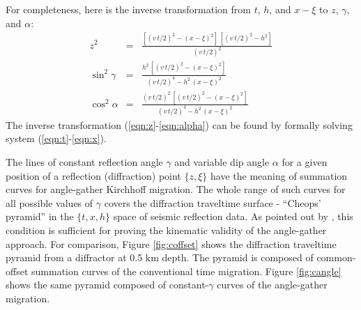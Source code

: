 For completeness, here is the inverse transformation from $t$, $h$,
and $x-\xi$ to $z$, $\gamma$, and $\alpha$:
\begin{eqnarray}
  \label{eqn:z}
  z^2 & = & 
  \frac{
    \left[(v\,t/2)^2 - (x-\xi)^2\right]\,
    \left[(v\,t/2)^2 - h^2\right]
    }{(v\,t/2)^2} 
  \\ \label{eqn:gamma}
  \sin^2{\gamma} & = & 
  \frac{h^2\, \left[(v\,t/2)^2 - (x-\xi)^2\right]}
  {(v\,t/2)^4 - h^2\,(x-\xi)^2}
  \\ \label{eqn:alpha}
  \cos^2{\alpha} & = & 
  \frac{(v\,t/2)^2\, \left[(v\,t/2)^2 - (x-\xi)^2\right]}
  {(v\,t/2)^4 - h^2\,(x-\xi)^2}
\end{eqnarray}
The inverse transformation (\ref{eqn:z}-\ref{eqn:alpha}) can be found
by formally solving system (\ref{eqn:t}-\ref{eqn:x}).
\par
The lines of constant reflection angle $\gamma$ and variable dip angle
$\alpha$ for a given position of a reflection (diffraction) point
$\{z,\xi\}$ have the meaning of summation curves for angle-gather
Kirchhoff migration. The whole range of such curves for all possible
values of $\gamma$ covers the diffraction traveltime surface -
``Cheops' pyramid'' \cite[]{Claerbout.blackwell.85} in the $\{t,x,h\}$
space of seismic reflection data.  As pointed out by
\cite{fowler}, this condition is sufficient for proving the
kinematic validity of the angle-gather approach.  For comparison,
Figure \ref{fig:coffset} shows the diffraction traveltime pyramid from
a diffractor at 0.5 km depth.  The pyramid is composed of
common-offset summation curves of the conventional time migration.
Figure \ref{fig:cangle} shows the same pyramid composed of
constant-$\gamma$ curves of the angle-gather migration.




